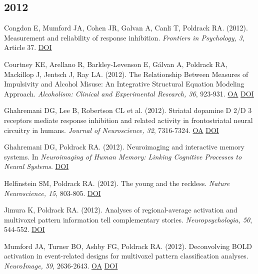 \documentclass[10pt, letterpaper]{article}
\begin{document}
\subsection*{2012}Congdon E, Mumford JA, Cohen JR, Galvan A, Canli T, Poldrack RA.  (2012). Measurement and reliability of response inhibition. \textit{Frontiers in Psychology, 3}, Article 37. \href{https://doi.org/10.3389/fpsyg.2012.00037}{DOI} \vspace{2mm}

Courtney KE, Arellano R, Barkley-Levenson E, Gálvan A, Poldrack RA, Mackillop J, Jentsch J, Ray LA.  (2012). The Relationship Between Measures of Impulsivity and Alcohol Misuse: An Integrative Structural Equation Modeling Approach. \textit{Alcoholism: Clinical and Experimental Research, 36}, 923-931. \href{https://www.ncbi.nlm.nih.gov/pmc/articles/PMC3291799}{OA} \href{https://doi.org/10.1111/j.1530-0277.2011.01635.x}{DOI} \vspace{2mm}

Ghahremani DG, Lee B, Robertson CL et al. (2012). Striatal dopamine D 2/D 3 receptors mediate response inhibition and related activity in frontostriatal neural circuitry in humans. \textit{Journal of Neuroscience, 32}, 7316-7324. \href{https://www.ncbi.nlm.nih.gov/pmc/articles/PMC3517177}{OA} \href{https://doi.org/10.1523/jneurosci.4284-11.2012}{DOI} \vspace{2mm}

Ghahremani DG, Poldrack RA.  (2012). Neuroimaging and interactive memory systems. In \textit{Neuroimaging of Human Memory: Linking Cognitive Processes to Neural Systems}. \href{https://doi.org/10.1093/acprof:oso/9780199217298.003.0006}{DOI} \vspace{2mm}

Helfinstein SM, Poldrack RA.  (2012). The young and the reckless. \textit{Nature Neuroscience, 15}, 803-805. \href{https://doi.org/10.1038/nn.3116}{DOI} \vspace{2mm}

Jimura K, Poldrack RA.  (2012). Analyses of regional-average activation and multivoxel pattern information tell complementary stories. \textit{Neuropsychologia, 50}, 544-552. \href{https://doi.org/10.1016/j.neuropsychologia.2011.11.007}{DOI} \vspace{2mm}

Mumford JA, Turner BO, Ashby FG, Poldrack RA.  (2012). Deconvolving BOLD activation in event-related designs for multivoxel pattern classification analyses. \textit{NeuroImage, 59}, 2636-2643. \href{https://www.ncbi.nlm.nih.gov/pmc/articles/PMC3251697}{OA} \href{https://doi.org/10.1016/j.neuroimage.2011.08.076}{DOI} \vspace{2mm}
\end{document}

